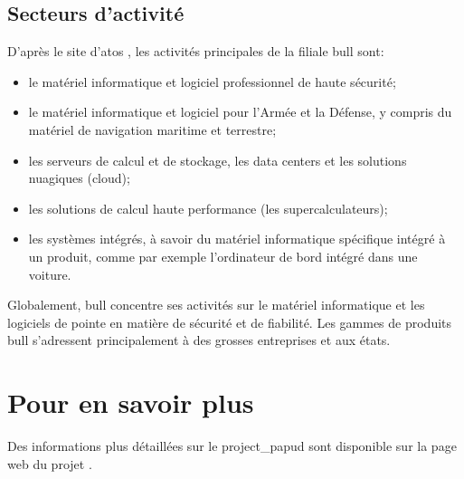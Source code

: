 \subsection*{Secteurs d'activité}
D'après {le site d'\gls{atos} \autocite{bull_produits}}, les activités principales de la filiale \gls{bull} sont:
\begin{itemize}
	\item le matériel informatique et logiciel professionnel de haute sécurité;
	\item le matériel informatique et logiciel pour l'Armée et la Défense, y compris du matériel de navigation maritime et terrestre;
	\item les serveurs de calcul et de stockage, les \gls{data centers} et les solutions nuagiques (\gls{cloud});
	\item les solutions de calcul haute performance (les \og supercalculateurs\fg{});
	\item les systèmes intégrés, à savoir du matériel informatique spécifique intégré à un produit, comme par exemple l'ordinateur de bord intégré dans une voiture.
\end{itemize}
\vspace{1em}

Globalement, \gls{bull} concentre ses activités sur le matériel informatique et les logiciels de pointe en matière de sécurité et de fiabilité.
Les gammes de produits \gls{bull} s'adressent principalement à des grosses entreprises et aux états.

\section*{Pour en savoir plus}
Des informations plus détaillées sur le \gls{project_papud} sont disponible sur la page web du projet \autocite{about_papud}.